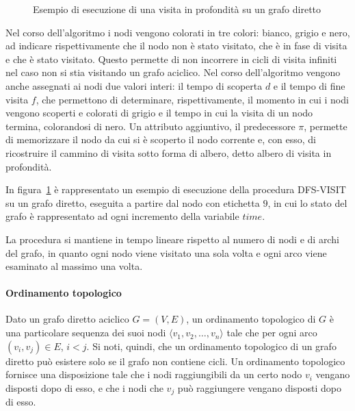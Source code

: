 


\begin{figure}
    
    \caption{Esempio di esecuzione di una visita in profondit\`a su un grafo diretto}
    \label{fig:dfs-example}
\end{figure}

Nel corso dell'algoritmo i nodi vengono colorati in tre colori: bianco, grigio e nero, ad indicare rispettivamente
che il nodo non \`e stato visitato, che \`e in fase di visita e che \`e stato visitato.
Questo permette di non incorrere in cicli di visita infiniti nel caso non si stia visitando un grafo aciclico.
Nel corso dell'algoritmo vengono anche assegnati ai nodi due valori interi: il tempo di scoperta $d$ e il tempo di
fine visita $f$, che permettono di determinare, rispettivamente, il momento in cui i nodi vengono scoperti e colorati
di grigio e il tempo in cui la visita di un nodo termina, colorandosi di nero.
Un attributo aggiuntivo, il predecessore $\pi$, permette di memorizzare il nodo da cui si \`e scoperto il nodo
corrente e, con esso, di ricostruire il cammino di visita sotto forma di albero, detto albero di visita in profondit\`a.
\newline

In figura~\ref{fig:dfs-example} \`e rappresentato un esempio di esecuzione della procedura DFS-VISIT su un grafo
diretto, eseguita a partire dal nodo con etichetta $9$, in cui lo stato del grafo \`e rappresentato ad ogni
incremento della variabile $time$. \newline

La procedura si mantiene in tempo lineare rispetto al numero di nodi e di archi del grafo, in quanto
ogni nodo viene visitato una sola volta e ogni arco viene esaminato al massimo una volta.

\paragraph{Ordinamento topologico}
Dato un grafo diretto aciclico $G = (V, E)$, un ordinamento topologico di $G$ \`e una particolare sequenza
dei suoi nodi $\langle v_1, v_2, \ldots, v_n \rangle$ tale che per ogni arco $(v_i, v_j) \in E$, $i < j$.
Si noti, quindi, che un ordinamento topologico di un grafo diretto pu\`o esistere solo se il grafo non contiene
cicli.
Un ordinamento topologico fornisce una disposizione tale che i nodi raggiungibili da un certo nodo $v_i$ vengano
disposti dopo di esso, e che i nodi che $v_j$ pu\`o raggiungere vengano disposti dopo di esso.

